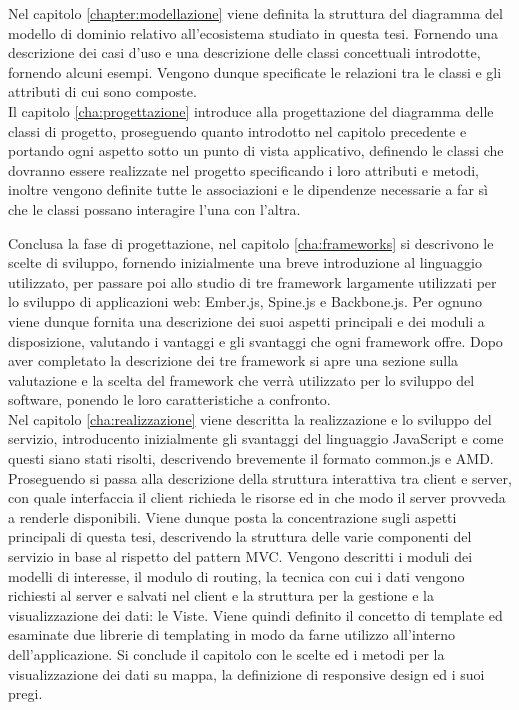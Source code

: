 Nel capitolo \ref{chapter:modellazione} viene definita la struttura del diagramma del modello di dominio relativo all'ecosistema studiato in questa tesi. Fornendo una descrizione dei casi d'uso e una descrizione delle classi concettuali introdotte, fornendo alcuni esempi. Vengono dunque specificate le relazioni tra le classi e gli attributi di cui sono composte.\\

Il capitolo \ref{cha:progettazione} introduce alla progettazione del diagramma delle classi di progetto, proseguendo quanto introdotto nel capitolo precedente e portando ogni aspetto sotto un punto di vista applicativo, definendo le classi che dovranno essere realizzate nel progetto specificando i loro attributi e metodi, inoltre vengono definite tutte le associazioni e le dipendenze necessarie a far sì che le classi possano interagire l'una con l'altra.\\
\newpage

Conclusa la fase di progettazione, nel capitolo \ref{cha:frameworks} si descrivono le scelte di sviluppo, fornendo inizialmente una breve introduzione al linguaggio utilizzato, per passare poi allo studio di tre framework largamente utilizzati per lo sviluppo di applicazioni web: Ember.js, Spine.js e Backbone.js. Per ognuno viene dunque fornita una descrizione dei suoi aspetti principali e dei moduli a disposizione, valutando i vantaggi e gli svantaggi che ogni framework offre. Dopo aver completato la descrizione dei tre framework si apre una sezione sulla valutazione e la scelta del framework che verrà utilizzato per lo sviluppo del software, ponendo le loro caratteristiche a confronto.\\

Nel capitolo \ref{cha:realizzazione} viene descritta la realizzazione e lo sviluppo del servizio, introducento inizialmente gli svantaggi del linguaggio JavaScript e come questi siano stati risolti, descrivendo brevemente il formato common.js e AMD. Proseguendo si passa alla descrizione della struttura interattiva tra client e server, con quale interfaccia il client richieda le risorse ed in che modo il server provveda a renderle disponibili. Viene dunque posta la concentrazione sugli aspetti principali di questa tesi, descrivendo la struttura delle varie componenti del servizio in base al rispetto del pattern MVC. Vengono descritti i moduli dei modelli di interesse, il modulo di routing, la tecnica con cui i dati vengono richiesti al server e salvati nel client e la struttura per la gestione e la visualizzazione dei dati: le Viste. Viene quindi definito il concetto di template ed esaminate due librerie di templating in modo da farne utilizzo all'interno dell'applicazione. Si conclude il capitolo con le scelte ed i metodi per la visualizzazione dei dati su mappa, la definizione di responsive design ed i suoi pregi.\\

